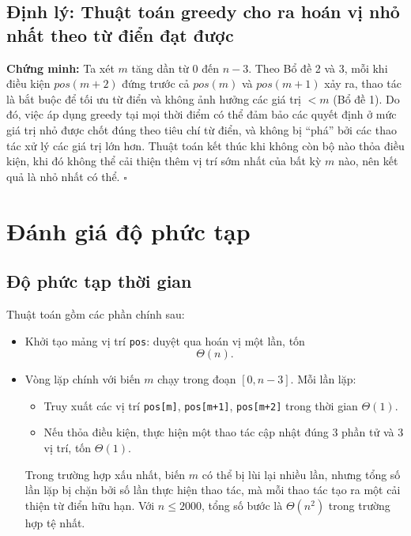 \documentclass[12pt,a4paper]{article}
\begin{document}
\subsection*{Định lý: Thuật toán greedy cho ra hoán vị nhỏ nhất theo từ điển đạt được}
\textbf{Chứng minh:}
Ta xét $m$ tăng dần từ $0$ đến $n-3$.
Theo Bổ đề 2 và 3, mỗi khi điều kiện $pos(m{+}2)$ đứng trước cả $pos(m)$ và $pos(m{+}1)$ xảy ra, thao tác là bắt buộc để tối ưu từ điển và không ảnh hưởng các giá trị $<m$ (Bổ đề 1).
Do đó, việc áp dụng greedy tại mọi thời điểm có thể đảm bảo các quyết định ở mức giá trị nhỏ được chốt đúng theo tiêu chí từ điển, và không bị ``phá'' bởi các thao tác xử lý các giá trị lớn hơn.
Thuật toán kết thúc khi không còn bộ nào thỏa điều kiện, khi đó không thể cải thiện thêm vị trí sớm nhất của bất kỳ $m$ nào, nên kết quả là nhỏ nhất có thể. \hfill$\square$

\section{Đánh giá độ phức tạp}

\subsection*{Độ phức tạp thời gian}

Thuật toán gồm các phần chính sau:

\begin{itemize}
	\item Khởi tạo mảng vị trí \texttt{pos}: duyệt qua hoán vị một lần, tốn
	\[
	\Theta(n).
	\]
	
	\item Vòng lặp chính với biến $m$ chạy trong đoạn $[0, n-3]$.  
	Mỗi lần lặp:
	\begin{itemize}
		\item Truy xuất các vị trí \texttt{pos[m]}, \texttt{pos[m+1]}, \texttt{pos[m+2]} trong thời gian \(\Theta(1)\).
		\item Nếu thỏa điều kiện, thực hiện một thao tác cập nhật đúng 3 phần tử và 3 vị trí, tốn \(\Theta(1)\).
	\end{itemize}
	
	Trong trường hợp xấu nhất, biến $m$ có thể bị lùi lại nhiều lần, nhưng tổng số lần lặp bị chặn bởi số lần thực hiện thao tác, mà mỗi thao tác tạo ra một cải thiện từ điển hữu hạn. Với $n \le 2000$, tổng số bước là \(\Theta(n^2)\) trong trường hợp tệ nhất.
\end{itemize}
\end{document}
